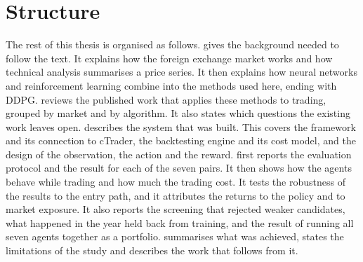 \section{Structure}

The rest of this thesis is organised as follows.  gives the background needed to follow the text. It explains how the foreign exchange market works and how technical analysis summarises a price series. It then explains how neural networks and reinforcement learning combine into the methods used here, ending with DDPG.  reviews the published work that applies these methods to trading, grouped by market and by algorithm. It also states which questions the existing work leaves open.  describes the system that was built. This covers the framework and its connection to cTrader, the backtesting engine and its cost model, and the design of the observation, the action and the reward.  first reports the evaluation protocol and the result for each of the seven pairs. It then shows how the agents behave while trading and how much the trading cost. It tests the robustness of the results to the entry path, and it attributes the returns to the policy and to market exposure. It also reports the screening that rejected weaker candidates, what happened in the year held back from training, and the result of running all seven agents together as a portfolio.  summarises what was achieved, states the limitations of the study and describes the work that follows from it.